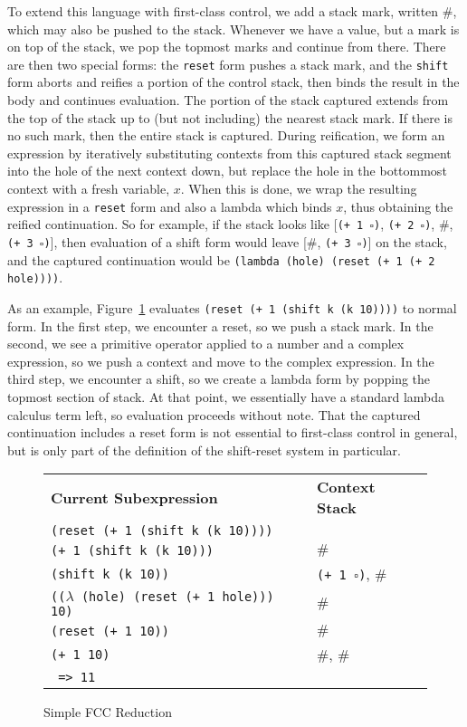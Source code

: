 \documentclass[11pt]{article}
\begin{document}
To extend this language with first-class control, we add a stack mark, written $\#$, which may also be pushed to the stack.
Whenever we have a value, but a mark is on top of the stack, we pop the topmost marks and continue from there.
There are then two special forms:
the \texttt{reset} form pushes a stack mark, and the \texttt{shift} form aborts and reifies a portion of the control stack, then binds the result in the body and continues evaluation.
The portion of the stack captured extends from the top of the stack up to (but not including) the nearest stack mark.
If there is no such mark, then the entire stack is captured.
During reification, we form an expression by iteratively substituting contexts from this captured stack segment into the hole of the next context down, but replace the hole in the bottommost context with a fresh variable, $x$.
When this is done, we wrap the resulting expression in a \texttt{reset} form and also a lambda which binds $x$, thus obtaining the reified continuation.
So for example, if the stack looks like [\texttt{(+ 1 $\square$)}, \texttt{(+ 2 $\square$)}, $\#$, \texttt{(+ 3 $\square$)}], then evaluation of a shift form would leave [$\#$, \texttt{(+ 3 $\square$)}] on the stack, and the captured continuation would be \texttt{(lambda (hole) (reset (+ 1 (+ 2 hole))))}.

As an example, Figure~\ref{fig:simple-fcc-reduction} evaluates \texttt{(reset (+ 1 (shift k (k 10))))} to normal form.
In the first step, we encounter a reset, so we push a stack mark.
In the second, we see a primitive operator applied to a number and a complex expression, so we push a context and move to the complex expression.
In the third step, we encounter a shift, so we create a lambda form by popping the topmost section of stack.
At that point, we essentially have a standard lambda calculus term left, so evaluation proceeds without note.
That the captured continuation includes a reset form is not essential to first-class control in general, but is only part of the definition of the shift-reset system in particular.

\begin{figure}[H]
\caption{Simple FCC Reduction}
\label{fig:simple-fcc-reduction}
\begin{tabular}{ll}
\textbf{Current Subexpression} & \textbf{Context Stack} \\
\texttt{(reset (+ 1 (shift k (k 10))))} & \\
\texttt{(+ 1 (shift k (k 10)))} & $\#$ \\
\texttt{(shift k (k 10))} & \texttt{(+ 1 $\square$)}, $\#$ \\
\texttt{(($\lambda$ (hole) (reset (+ 1 hole))) 10)} & $\#$ \\
\texttt{(reset (+ 1 10))} & $\#$ \\
\texttt{(+ 1 10)} & $\#$, $\#$ \\
\texttt{ => 11} \\
\end{tabular}
\end{figure}
\end{document}
